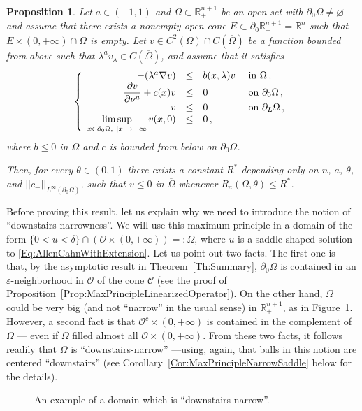 \documentclass[12pt,reqno]{amsart}
\newtheorem{proposition}[theorem]{Proposition}
\theoremstyle{definition}
\theoremstyle{remark}
\newcommand{\con}[1]{\mathbb{#1}}
\newcommand{\R}{\con{R}} %
\newcommand{\ccal}{\mathscr{C}}
\newcommand{\ocal}{\mathcal{O}}
\newcommand{\norm}[1]{\left | \left |{#1} \right | \right |}
\newcommand\beqc[1]{\left\{\begin{array}{#1}}
\newcommand\eeqc{\end{array} \right.}
\def\PDEsystem{rcll}
\let\div\relax
\DeclareMathOperator{\div}{div}
\def\ds{\displaystyle}
\numberwithin{equation}{section}
\begin{document}
\begin{proposition}
\label{Prop:MaxPrincipleNarrow}
Let $a\in (-1,1)$ and $\Omega \subset \R^{n+1}_+$ be an open set with $\partial_0 \Omega \neq \varnothing$ and assume that there exists a nonempty open cone $E\subset \partial_0 \R^{n+1}_+ = \R^n$ such that $E \times (0,+\infty)\cap \Omega$ is empty. Let $v \in C^2 (\Omega)\cap C(\overline{\Omega})$ be a function bounded from above such that $\lambda^a v_\lambda \in C (\overline{\Omega})$, and assume that it satisfies
$$
\beqc{\PDEsystem}
-\div(\lambda^a \nabla v) &\leq& b(x,\lambda) v & \text{ in } \Omega\,, \\
\dfrac{\partial v}{\partial \nu^a}  + c(x) v &\leq & 0 & \text{ on } \partial_0 \Omega \,, \\
v & \leq & 0 & \text{ on } \partial_L \Omega\,,\\
\ds \limsup_{x \in \partial_0\Omega,\ |x|\to +\infty} v(x,0) & \leq & 0\,,
\eeqc
$$
where $b \leq 0$ in $\Omega$ and $c$ is bounded from below on $\partial_0 \Omega$.

Then, for every $\theta \in (0,1)$ there exists a constant $R^*$ depending only on $n$, $a$, $\theta$, and $\norm{c_-}_{L^\infty(\partial_0 \Omega)}$, such that $v\leq 0 $ in $\overline{\Omega}$ whenever $R_a(\Omega,\theta) \leq R^*$.
\end{proposition}


Before proving this result, let us explain why we need to introduce the notion of ``downstairs-narrowness''\!. We will use this maximum principle in a domain of the form $\{0<u<\delta\}\cap \left(\ocal\times (0,+\infty)\right) =: \Omega$, where $u$ is a saddle-shaped solution to \eqref{Eq:AllenCahnWithExtension}. Let us point out two facts. The first one is that, by the asymptotic result in Theorem~\ref{Th:Summary}, $\partial_0\Omega$ is contained in an $\varepsilon$-neighborhood in $\ocal$ of the cone $\ccal$ (see the proof of Proposition~\ref{Prop:MaxPrincipleLinearizedOperator}). On the other hand, $\Omega$ could  be very big (and not ``narrow'' in the usual sense) in $\R^{n+1}_+$, as in Figure~\ref{Fig:DownstairsNarrow}. However, a second fact is that $\ocal^c\times (0,+\infty)$ is contained in the complement of $\Omega$ --- even if $\Omega$ filled almost all $\ocal\times (0,+\infty)$. From these two facts, it follows readily that $\Omega$ is ``downstairs-narrow'' ---using, again, that balls in this notion are centered ``downstairs'' (see Corollary~\ref{Cor:MaxPrincipleNarrowSaddle} below for the details).

\begin{figure}

\caption{An example of a domain which is ``downstairs-narrow''\!.}
\label{Fig:DownstairsNarrow}
\end{figure}
\end{document}
